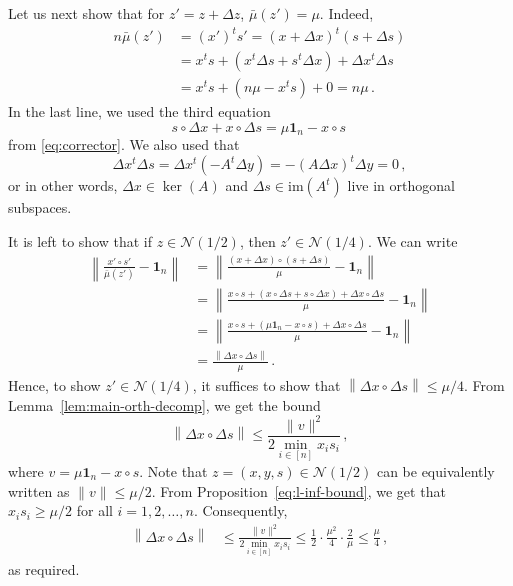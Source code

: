 \documentclass[12pt, showidx, twoside]{article}
\def\N{\mathbb{N}}
\def\gap{\bar{\mu}}
\def\bo{\mathbf{1}}
\def\N{\mathcal{N}}
\begin{document}
{{{Let us next show that for $z'=z+\Delta z$, $\gap(z')=\mu$. 
Indeed,
\begin{equation}\label{eq:gap-bound}
\begin{aligned}
n\gap(z')&=(x')^t s'=(x+\Delta x)^t (s+\Delta s)\\
&=x^t s+\left(x^t\Delta s+s^t\Delta x\right)+\Delta x^t \Delta s\\
&=x^t s+ (n\mu-x^t s )+0=n\mu\, .
\end{aligned}
\end{equation}
In the last line, we used the third equation 
\[
s\circ \Delta x+x\circ \Delta s=\mu\bo_n-x\circ s\,
\]
from \eqref{eq:corrector}. We also used that 
\[
    \Delta x^t \Delta s= \Delta x^t(-A^t\Delta y)=-(A\Delta x)^t \Delta y=0\, ,
\]
or in other words, $\Delta x\in \ker(A)$ and $\Delta s\in\mathrm{im}(A^t)$ live in orthogonal subspaces.

It is left to show that if $z\in\N(1/2)$, then $z'\in\N(1/4)$. We can write 
\begin{equation}\label{eq:centrality-error}
\begin{aligned}
\left\|\frac{x'\circ s'}{\gap(z')}- \bo_n\right\|&=\left\|\frac{(x+\Delta x)\circ (s+\Delta s)}{\mu}- \bo_n\right\|\\
&=\left\|\frac{x\circ s+(x\circ\Delta s+s\circ\Delta x)+\Delta x\circ \Delta s}{\mu}- \bo_n\right\|\\
&=\left\|\frac{x\circ s+(\mu\bo_n-x\circ s)+\Delta x\circ \Delta s}{\mu}- \bo_n\right\|\\
&=\frac{\left\|\Delta x\circ \Delta s\right\|}{\mu}\, .
\end{aligned}
\end{equation}
Hence, to  show $z'\in\N(1/4)$, it suffices to show that $\left\|\Delta x\circ \Delta s\right\|\le\mu/4$.
From Lemma~\ref{lem:main-orth-decomp}, we get the bound 
\[
    \left\|\Delta x\circ \Delta s\right\|\le \frac{\|v\|^2}{2\min_{i\in[n]}{x_is_i}}\, ,
\]
where $v=\mu\bo_n-x\circ s$. 
Note that $z=(x,y,s)\in\N(1/2)$ can be equivalently written as $\|v\|\le \mu/2$. From Proposition~\ref{eq:l-inf-bound}, we get that $x_i s_i\ge \mu/2$ for all $i=1,2,\ldots,n$. Consequently,
\[
\begin{aligned}
  \left\|\Delta x\circ \Delta s\right\|&\le 
\frac{\|v\|^2}{2\min_{i\in[n]}{x_is_i}}\le \frac{1}{2}\cdot \frac{\mu^2}{4}\cdot \frac{2}{\mu}\le \frac{\mu}{4}\, ,
\end{aligned} 
\]
as required.

}}}
\end{document}
